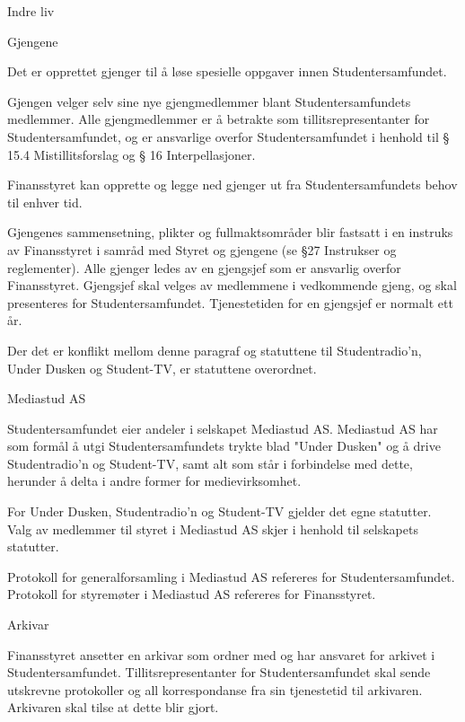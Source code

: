 \documentclass[fsbok.tex]{subfiles}
\begin{document}
\begin{lovkapittel}{Indre liv}

  \begin{lovparagraf}{Gjengene}
  
Det er opprettet gjenger til å løse spesielle oppgaver innen Studentersamfundet.

Gjengen velger selv sine nye gjengmedlemmer blant Studentersamfundets medlemmer. Alle gjengmedlemmer er å
betrakte som tillitsrepresentanter for Studentersamfundet, og er ansvarlige overfor Studentersamfundet i henhold til §
15.4 Mistillitsforslag og § 16 Interpellasjoner.

Finansstyret kan opprette og legge ned gjenger ut fra Studentersamfundets behov til enhver tid.

Gjengenes sammensetning, plikter og fullmaktsområder blir fastsatt i en instruks av Finansstyret i samråd med Styret
og gjengene (se §27 Instrukser og reglementer). Alle gjenger ledes av en gjengsjef som er ansvarlig overfor
Finansstyret. Gjengsjef skal velges av medlemmene i vedkommende gjeng, og skal presenteres for
Studentersamfundet. Tjenestetiden for en gjengsjef er normalt ett år.

Der det er konflikt mellom denne paragraf og statuttene til Studentradio'n, Under Dusken og Student-TV, er statuttene
overordnet.

  \end{lovparagraf}
  
  \begin{lovparagraf}{Mediastud AS}
  
Studentersamfundet eier andeler i selskapet Mediastud AS. Mediastud AS har som formål å utgi Studentersamfundets
trykte blad "Under Dusken" og å drive Studentradio’n og Student-TV, samt alt som står i forbindelse med dette,
herunder å delta i andre former for medievirksomhet.

For Under Dusken, Studentradio’n og Student-TV gjelder det egne statutter. Valg av medlemmer til styret i Mediastud
AS skjer i henhold til selskapets statutter.

Protokoll for generalforsamling i Mediastud AS refereres for Studentersamfundet. Protokoll for styremøter i
Mediastud AS refereres for Finansstyret.

  \end{lovparagraf}
  
  \begin{lovparagraf}{Arkivar}
  
Finansstyret ansetter en arkivar som ordner med og har ansvaret for arkivet i Studentersamfundet. Tillitsrepresentanter
for Studentersamfundet skal sende utskrevne protokoller og all korrespondanse fra sin tjenestetid til arkivaren.
Arkivaren skal tilse at dette blir gjort.
  

\end{lovparagraf}
\end{lovkapittel}
\end{document}
